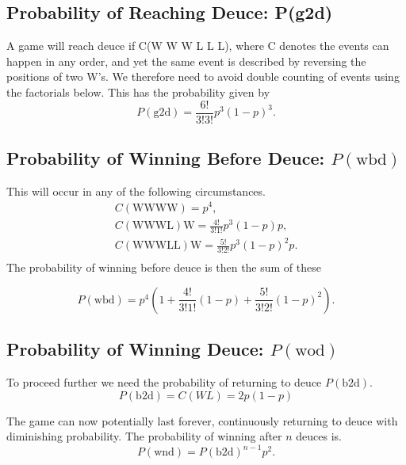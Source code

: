\documentclass[10pt]{article}
\begin{document}
\subsection{Probability of Reaching Deuce: P(g2d)}

A game will reach deuce if C(W W W L L L), where C denotes the events can happen in any order, and yet the same event is described by reversing the positions of two W's. We therefore need to avoid double counting of events using the factorials below. This has the probability given by
\begin{equation}
\label{eq_g2d}
P(\mathrm{g2d}) = \frac{6!}{3!3!}p^3 ( 1 - p)^3.
\end{equation}


\subsection{Probability of Winning Before Deuce: $P ( \mathrm{wbd} )$ }
This will occur in any of the following circumstances.
\begin{equation}
\label{eq_C}
\begin{split}
C(\mathrm{W W W W}) = p^4, \\
C(\mathrm{W W W L}) \mathrm{W} = \frac{4!}{3!1!}p^3 (1-p) p, \\
C(\mathrm{W W W L L}) \mathrm{W} = \frac{5!}{3!2!}p^3 (1-p)^2 p. \\
\end{split}
\end{equation}
\noindent The probability of winning before deuce is then the sum of these

\begin{equation}
\label{eq_pwbd}
P(\mathrm{wbd}) = p^4 \left( 1 + \frac{4!}{3!1!} (1-p) + \frac{5!}{3!2!}(1-p)^2 \right).
\end{equation}



\subsection{Probability of Winning Deuce: $P(\mathrm{wod})$}
To proceed further we need the probability of returning to deuce $P(\mathrm{b2d})$.
\begin{equation}
\label{eq_pb2d}
P(\mathrm{b2d}) = C(WL) = 2p(1-p)
\end{equation}

\noindent The game can now potentially last forever, continuously returning to deuce with diminishing probability. The probability of winning after $n$ deuces is. 
\begin{equation}
P(\mathrm{wnd}) = P(\mathrm{b2d})^{n-1} p^2.
\end{equation}
\end{document}
